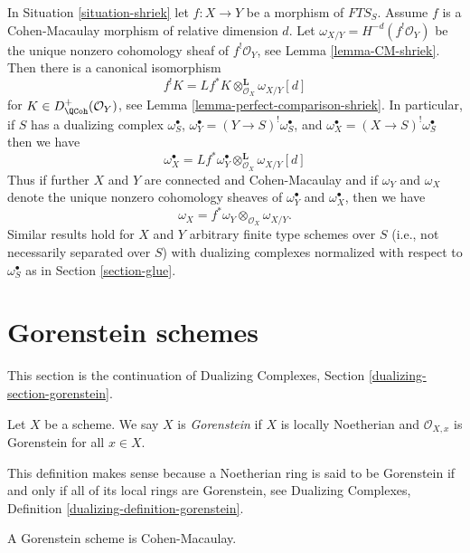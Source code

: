 \begin{remark}
\label{remark-CM-morphism-compare-dualizing}
In Situation \ref{situation-shriek} let $f : X \to Y$ be a morphism
of $\textit{FTS}_S$. Assume $f$ is a Cohen-Macaulay morphism of
relative dimension $d$. Let $\omega_{X/Y} = H^{-d}(f^!\mathcal{O}_Y)$
be the unique nonzero cohomology sheaf of $f^!\mathcal{O}_Y$, see
Lemma \ref{lemma-CM-shriek}.
Then there is a canonical isomorphism
$$
f^!K = Lf^*K \otimes_{\mathcal{O}_X}^\mathbf{L} \omega_{X/Y}[d]
$$
for $K \in D^+_\QCoh(\mathcal{O}_Y)$, see
Lemma \ref{lemma-perfect-comparison-shriek}. In particular, if
$S$ has a dualizing complex $\omega_S^\bullet$,
$\omega_Y^\bullet = (Y \to S)^!\omega_S^\bullet$, and
$\omega_X^\bullet = (X \to S)^!\omega_S^\bullet$
then we have
$$
\omega_X^\bullet =
Lf^*\omega_Y^\bullet \otimes_{\mathcal{O}_X}^\mathbf{L} \omega_{X/Y}[d]
$$
Thus if further $X$ and $Y$ are connected and Cohen-Macaulay and
if $\omega_Y$ and $\omega_X$ denote the unique nonzero cohomology
sheaves of $\omega_Y^\bullet$ and $\omega_X^\bullet$, then we
have
$$
\omega_X = f^*\omega_Y \otimes_{\mathcal{O}_X} \omega_{X/Y}.
$$
Similar results hold for $X$ and $Y$ arbitrary finite type schemes
over $S$ (i.e., not necessarily separated over $S$)
with dualizing complexes normalized with respect to
$\omega_S^\bullet$ as in Section \ref{section-glue}.
\end{remark}





\section{Gorenstein schemes}
\label{section-gorenstein}

\noindent
This section is the continuation of Dualizing Complexes, Section
\ref{dualizing-section-gorenstein}.

\begin{definition}
\label{definition-gorenstein}
Let $X$ be a scheme. We say $X$ is {\it Gorenstein} if $X$ is
locally Noetherian and $\mathcal{O}_{X, x}$ is Gorenstein for all $x \in X$.
\end{definition}

\noindent
This definition makes sense because a Noetherian ring is said to
be Gorenstein if and only if all of its local rings are Gorenstein,
see Dualizing Complexes, Definition \ref{dualizing-definition-gorenstein}.

\begin{lemma}
\label{lemma-gorenstein-CM}
A Gorenstein scheme is Cohen-Macaulay.
\end{lemma}

